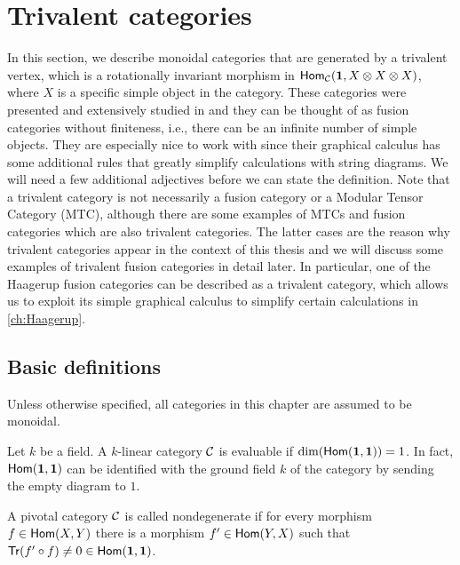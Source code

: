 \chapter{Trivalent categories}
\label{ch:Trivalent}

In this section, we describe monoidal categories that are generated by a trivalent vertex, which is a rotationally invariant morphism in $\mathsf{Hom}_{\mathcal{C}}(\mathbf{1},X\otimes X\otimes X)$, where $X$ is a specific simple object in the category. These categories were presented and extensively studied in \cite{Morrison2017} and they can be thought of as fusion categories without finiteness, i.e., there can be an infinite number of simple objects. They are especially nice to work with since their graphical calculus has some additional rules that greatly simplify calculations with string diagrams. We will need a few additional adjectives before we can state the definition. Note that a trivalent category is not necessarily a fusion category or a Modular Tensor Category (MTC), although there are some examples of MTCs and fusion categories which are also trivalent categories. The latter cases are the reason why trivalent categories appear in the context of this thesis and we will discuss some examples of trivalent fusion categories in detail later. In particular, one of the Haagerup fusion categories can be described as a trivalent category, which allows us to exploit its simple graphical calculus to simplify certain calculations in \cref{ch:Haagerup}.

\section{Basic definitions}

Unless otherwise specified, all categories in this chapter are assumed to be monoidal.

	\begin{defn}[Evaluable]
		Let $k$ be a field. A $k$-linear category ${\mathcal{C}}$ is evaluable if $\dim(\mathsf{Hom}(\mathbf{1},\mathbf{1}))=1$. In fact, $\mathsf{Hom}(\mathbf{1,\mathbf{1}})$ can be identified with the ground field $k$ of the category by sending the empty diagram to $1$.
	\end{defn}

	\begin{defn}[Nondegenerate]
		A pivotal category ${\mathcal{C}}$ is called nondegenerate if for every morphism $f\in\mathsf{Hom}(X,Y)$ there is a morphism $f'\in\mathsf{Hom}(Y,X)$ such that $\mathsf{Tr}(f'\circ f)\neq 0\in\mathsf{Hom}(\mathbf{1,\mathbf{1}})$.
	\end{defn}
	
